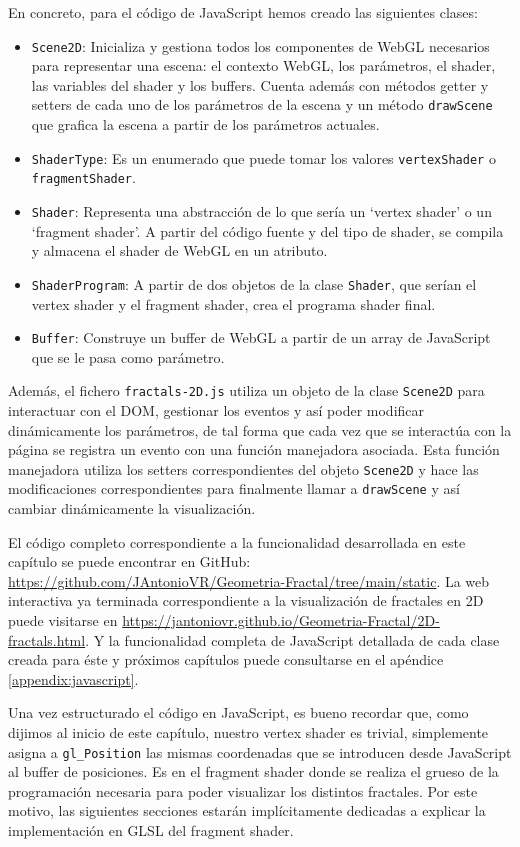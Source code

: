 En concreto, para el código de JavaScript hemos creado las siguientes clases:
\begin{itemize}
    \item \verb|Scene2D|: Inicializa y gestiona todos los componentes de WebGL necesarios para representar una escena: el contexto WebGL, los parámetros, el shader, las variables del shader y los buffers. Cuenta además con métodos getter y setters de cada uno de los parámetros de la escena y un método \verb|drawScene| que grafica la escena a partir de los parámetros actuales.
    \item \texttt{ShaderType}: Es un enumerado que puede tomar los valores \texttt{vertexShader} o \texttt{fragmentShader}.
    \item \verb|Shader|: Representa una abstracción de lo que sería un `vertex shader' o un `fragment shader'. A partir del código fuente y del tipo de shader, se compila y almacena el shader de WebGL en un atributo.
    \item \verb|ShaderProgram|: A partir de dos objetos de la clase \verb|Shader|, que serían el vertex shader y el fragment shader, crea el programa shader final.
    \item \verb|Buffer|: Construye un buffer de WebGL a partir de un array de JavaScript que se le pasa como parámetro.
\end{itemize}

Además, el fichero \verb|fractals-2D.js| utiliza un objeto de la clase \verb|Scene2D| para interactuar con el DOM, gestionar los eventos y así poder modificar dinámicamente los parámetros, de tal forma que cada vez que se interactúa con la página se registra un evento con una función manejadora asociada. Esta función manejadora utiliza los setters correspondientes del objeto \verb|Scene2D| y hace las modificaciones correspondientes para finalmente llamar a \verb|drawScene| y así cambiar dinámicamente la visualización.

El código completo correspondiente a la funcionalidad desarrollada en este capítulo se puede encontrar en GitHub: \url{https://github.com/JAntonioVR/Geometria-Fractal/tree/main/static}. La web interactiva ya terminada correspondiente a la visualización de fractales en 2D puede visitarse en \url{https://jantoniovr.github.io/Geometria-Fractal/2D-fractals.html}. Y la funcionalidad completa de JavaScript detallada de cada clase creada para éste y próximos capítulos puede consultarse en el apéndice \ref{appendix:javascript}.

Una vez estructurado el código en JavaScript, es bueno recordar que, como dijimos al inicio de este capítulo, nuestro vertex shader es trivial, simplemente asigna a \verb|gl_Position| las mismas coordenadas que se introducen desde JavaScript al buffer de posiciones. Es en el fragment shader donde se realiza el grueso de la programación necesaria para poder visualizar los distintos fractales. Por este motivo, las siguientes secciones estarán implícitamente dedicadas a explicar la implementación en GLSL del fragment shader. 

